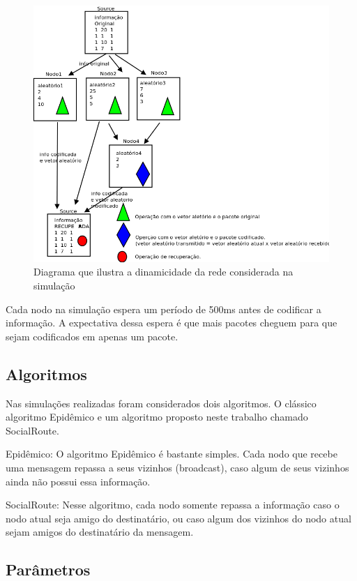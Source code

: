 \begin{figure}[ht]
\centering
\includegraphics[width=.9\textwidth]{img/diagramas/netCodingDiagram.png}
\caption{Diagrama que ilustra a dinamicidade da rede considerada na
simulação}
\label{figNetcodingDiagram}
\end{figure}

Cada nodo na simulação espera um período de 500ms antes de codificar a
informação. A expectativa dessa espera é que mais pacotes cheguem para
que sejam codificados em apenas um pacote.


\subsection{Algoritmos}\label{algoritmos}

Nas simulações realizadas foram considerados dois algoritmos. O clássico
algoritmo Epidêmico e um algoritmo proposto neste trabalho chamado
SocialRoute. 

Epidêmico: O algoritmo Epidêmico é bastante simples. Cada nodo que
recebe uma mensagem repassa a seus vizinhos (broadcast), caso algum de
seus vizinhos ainda não possui essa informação. 

SocialRoute: Nesse algoritmo, cada nodo somente repassa a informação
caso o nodo atual seja amigo do destinatário, ou caso algum dos vizinhos
do nodo atual sejam amigos do destinatário da mensagem.

\subsection{Parâmetros}

